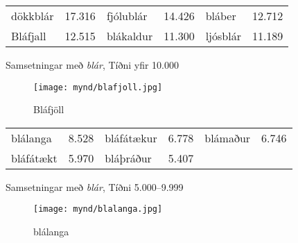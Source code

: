 \documentclass[../samsetningasafn.tex]{subfiles}
\begin{document}
\begin{wordlist}[H]
\begin{tcolorbox}

	\setlength{\extrarowheight}{3pt} 
	\begin{tabular}{BlBlBl}
		dökkblár		& 17.316	& 		
		fjólublár		& 14.426	& 		
		bláber		& 12.712	\\ 	
		Bláfjall		& 12.515	& 		
		blákaldur	& 11.300	&   	
		ljósblár		& 11.189	 		
	\end{tabular}

\end{tcolorbox}
	\caption{Samsetningar með \textit{blár}, Tíðni yfir 10.000}
	\label{listi:blatt.10000}
\end{wordlist}

\begin{figure}[H]
\begin{tcolorbox}
\centering
	\texttt{[image: mynd/blafjoll.jpg]}
\end{tcolorbox}
	\caption{Bláfjöll}
	\label{mynd:blafjoll}
\end{figure}

\begin{wordlist}[H]
\begin{tcolorbox}

	\setlength{\extrarowheight}{3pt}
	\begin{tabular}{BlBlBl}
		blálanga		& 8.528		& 		
		bláfátækur 	& 6.778		& 		
		blámaður	& 6.746		\\ 	
		bláfátækt	& 5.970		& 		
		bláþráður	& 5.407		&  
					&
	\end{tabular}

\end{tcolorbox}
	\caption{Samsetningar með \textit{blár}, Tíðni 5.000--9.999}
	\label{listi:blatt.5000}
\end{wordlist}

\begin{figure}[H]
\begin{tcolorbox}
\centering
	\texttt{[image: mynd/blalanga.jpg]}
\end{tcolorbox}
	\caption{blálanga}
	\label{mynd:blalanga}
\end{figure}
\end{document}
